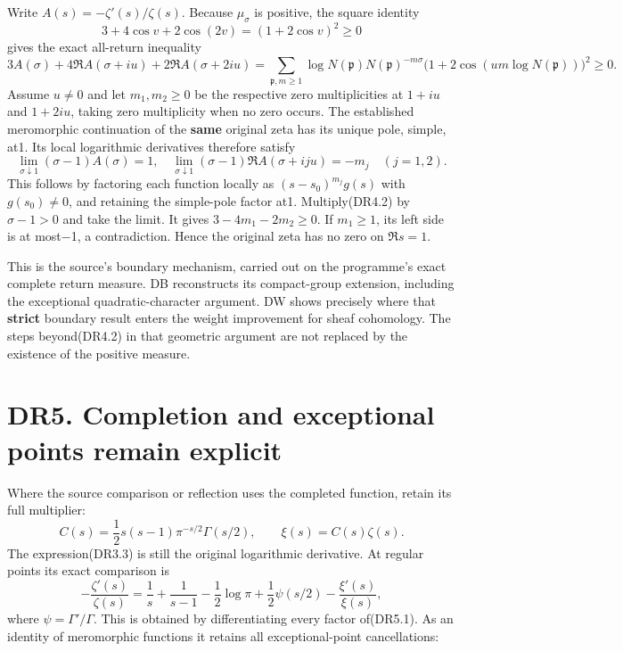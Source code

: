 \documentclass[
]{report}
\begin{document}
Write \(A(s)=-\zeta'(s)/\zeta(s)\). Because \(\mu_\sigma\) is positive,
the square identity \[
3+4\cos v+2\cos(2v)=(1+2\cos v)^2\ge0
\tag{DR4.1}
\] gives the exact all-return inequality \[
3A(\sigma)+4\Re A(\sigma+iu)+2\Re A(\sigma+2iu)
=\sum_{\mathfrak p,m\ge1}
\log N(\mathfrak p)N(\mathfrak p)^{-m\sigma}
\bigl(1+2\cos(um\log N(\mathfrak p))\bigr)^2\ge0.
\tag{DR4.2}
\] Assume \(u\ne0\) and let \(m_1,m_2\ge0\) be the respective zero
multiplicities at \(1+iu\) and \(1+2iu\), taking zero multiplicity when
no zero occurs. The established meromorphic continuation of the
\textbf{same} original zeta has its unique pole, simple, at1. Its local
logarithmic derivatives therefore satisfy \[
\lim_{\sigma\downarrow1}(\sigma-1)A(\sigma)=1,
\quad
\lim_{\sigma\downarrow1}(\sigma-1)\Re A(\sigma+iju)=-m_j
\quad(j=1,2).
\tag{DR4.3}
\] This follows by factoring each function locally as
\((s-s_0)^{m_j}g(s)\) with \(g(s_0)\ne0\), and retaining the simple-pole
factor at1. Multiply(DR4.2) by \(\sigma-1>0\) and take the limit. It
gives \(3-4m_1-2m_2\ge0\). If \(m_1\ge1\), its left side is at most−1, a
contradiction. Hence the original zeta has no zero on \(\Re s=1\).

This is the source's boundary mechanism, carried out on the programme's
exact complete return measure. DB reconstructs its compact-group
extension, including the exceptional quadratic-character argument. DW
shows precisely where that \textbf{strict} boundary result enters the
weight improvement for sheaf cohomology. The steps beyond(DR4.2) in that
geometric argument are not replaced by the existence of the positive
measure.

\section{DR5. Completion and exceptional points remain
explicit}\label{dr5.-completion-and-exceptional-points-remain-explicit}

Where the source comparison or reflection uses the completed function,
retain its full multiplier: \[
C(s)=\frac12s(s-1)\pi^{-s/2}\Gamma(s/2),\qquad
\xi(s)=C(s)\zeta(s).
\tag{DR5.1}
\] The expression(DR3.3) is still the original logarithmic derivative.
At regular points its exact comparison is \[
-\frac{\zeta'(s)}{\zeta(s)}
=\frac1s+\frac1{s-1}-\frac12\log\pi
 +\frac12\psi(s/2)-\frac{\xi'(s)}{\xi(s)},
\tag{DR5.2}
\] where \(\psi=\Gamma'/\Gamma\). This is obtained by differentiating
every factor of(DR5.1). As an identity of meromorphic functions it
retains all exceptional-point cancellations:
\end{document}
